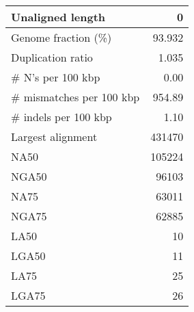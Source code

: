 \documentclass[12pt,a4paper]{article}
\begin{document}
\begin{table}[ht]
\begin{center}
\begin{tabular}{|l*{1}{|r}|}
Unaligned length & 0 \\ \hline
Genome fraction (\%) & 93.932 \\ \hline
Duplication ratio & 1.035 \\ \hline
\# N's per 100 kbp & 0.00 \\ \hline
\# mismatches per 100 kbp & 954.89 \\ \hline
\# indels per 100 kbp & 1.10 \\ \hline
Largest alignment & 431470 \\ \hline
NA50 & 105224 \\ \hline
NGA50 & 96103 \\ \hline
NA75 & 63011 \\ \hline
NGA75 & 62885 \\ \hline
LA50 & 10 \\ \hline
LGA50 & 11 \\ \hline
LA75 & 25 \\ \hline
LGA75 & 26 \\ \hline
\end{tabular}
\end{center}
\end{table}
\end{document}
